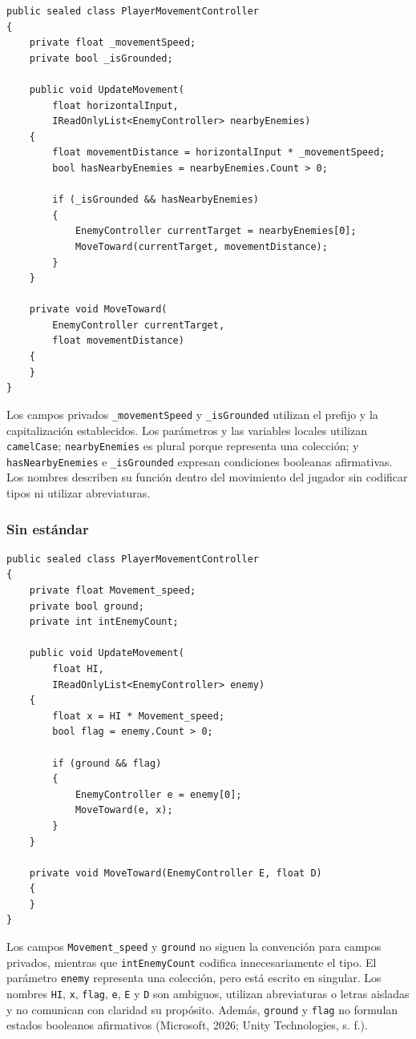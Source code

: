 \begin{lstlisting}[style=csharpstyle]
public sealed class PlayerMovementController
{
    private float _movementSpeed;
    private bool _isGrounded;

    public void UpdateMovement(
        float horizontalInput,
        IReadOnlyList<EnemyController> nearbyEnemies)
    {
        float movementDistance = horizontalInput * _movementSpeed;
        bool hasNearbyEnemies = nearbyEnemies.Count > 0;

        if (_isGrounded && hasNearbyEnemies)
        {
            EnemyController currentTarget = nearbyEnemies[0];
            MoveToward(currentTarget, movementDistance);
        }
    }

    private void MoveToward(
        EnemyController currentTarget,
        float movementDistance)
    {
    }
}
\end{lstlisting}

Los campos privados \texttt{\_movementSpeed} y \texttt{\_isGrounded} utilizan el prefijo y la capitalización establecidos. Los parámetros y las variables locales utilizan \texttt{camelCase}; \texttt{nearbyEnemies} es plural porque representa una colección; y \texttt{hasNearbyEnemies} e \texttt{\_isGrounded} expresan condiciones booleanas afirmativas. Los nombres describen su función dentro del movimiento del jugador sin codificar tipos ni utilizar abreviaturas.

\newpage
\subsubsection{Sin estándar}

\begin{lstlisting}[style=csharpstyle]
public sealed class PlayerMovementController
{
    private float Movement_speed;
    private bool ground;
    private int intEnemyCount;

    public void UpdateMovement(
        float HI,
        IReadOnlyList<EnemyController> enemy)
    {
        float x = HI * Movement_speed;
        bool flag = enemy.Count > 0;

        if (ground && flag)
        {
            EnemyController e = enemy[0];
            MoveToward(e, x);
        }
    }

    private void MoveToward(EnemyController E, float D)
    {
    }
}
\end{lstlisting}

Los campos \texttt{Movement\_speed} y \texttt{ground} no siguen la convención para campos privados, mientras que \texttt{intEnemyCount} codifica innecesariamente el tipo. El parámetro \texttt{enemy} representa una colección, pero está escrito en singular. Los nombres \texttt{HI}, \texttt{x}, \texttt{flag}, \texttt{e}, \texttt{E} y \texttt{D} son ambiguos, utilizan abreviaturas o letras aisladas y no comunican con claridad su propósito. Además, \texttt{ground} y \texttt{flag} no formulan estados booleanos afirmativos (Microsoft, 2026; Unity Technologies, s. f.).
